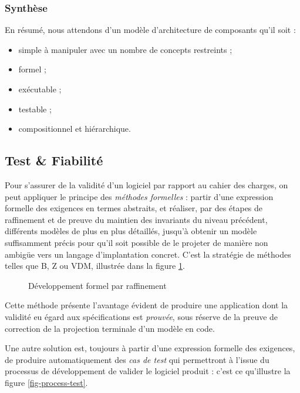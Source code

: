 \subsubsection{Synth\`ese}

En r\'esum\'e, nous attendons d'un mod\`ele d'architecture de
composants qu'il soit :
\begin{itemize}
  \item simple \`a manipuler avec un nombre de concepts restreints ;
  \item formel ;
  \item ex\'ecutable ;
  \item testable ;
  \item compositionnel et hi\'erarchique.
\end{itemize}

\subsection{Test \& Fiabilit\'e}

Pour s'assurer de la validit\'e d'un logiciel par rapport au cahier
des charges, on peut appliquer le principe des \emph{m\'ethodes
  formelles} : partir d'une expression formelle des exigences
en termes abstraits, et r\'ealiser, par des \'etapes de raffinement et
de preuve du maintien des invariants du niveau pr\'ec\'edent,
diff\'erents mod\`eles de plus en plus d\'etaill\'es, jusqu'\`a
obtenir un mod\`ele suffisamment pr\'ecis pour qu'il soit possible
de le projeter de mani\`ere non ambig\"ue vers un langage
d'implantation concret. C'est la strat\'egie de m\'ethodes telles
que \textsf{B}, \textsf{Z} ou \textsf{VDM}, illustr\'ee dans la
figure \ref{fig-process-b}.

\begin{figure}[htbp]
    \centering
    \caption{D\'eveloppement formel par raffinement}
    \label{fig-process-b}
\end{figure}

Cette m\'ethode pr\'esente l'avantage \'evident de produire une application
dont la validit\'e eu \'egard aux sp\'ecifications est
\emph{prouv\'ee}, sous r\'eserve de la preuve de correction de la
projection terminale d'un mod\`ele en code. 

Une autre solution est, toujours \`a partir d'une expression formelle des
exigences, de produire automatiquement des \emph{cas de test} qui
permettront \`a l'issue du processus de d\'eveloppement  de valider
le logiciel produit : c'est ce qu'illustre la figure
\ref{fig-process-test}. 

